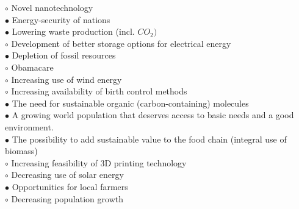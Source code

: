 \documentclass[]{beamer}
\begin{document}
\begin{CJK}{UTF8}{gbsn}
\begin{frame}[shrink] {}
{\color{red}$\circ$} Novel nanotechnology   \\
{\color{red}$\bullet$} Energy-security of nations  \\
{\color{red}$\bullet$} Lowering waste production (incl. $CO_{2})$   \\
{\color{red}$\circ$} Development of better storage options for electrical energy  \\
{\color{red}$\bullet$} Depletion of fossil resources   \\
{\color{red}$\circ$} Obamacare  \\
{\color{red}$\circ$} Increasing use of wind energy  \\
{\color{red}$\circ$} Increasing availability of birth control methods  \\
{\color{red}$\bullet$} The need for sustainable organic (carbon-containing) molecules  \\
{\color{red}$\bullet$} A growing world population that deserves access to basic needs and a good environment.  \\
{\color{red}$\bullet$} The possibility to add sustainable value to the food chain (integral use of biomass)  \\
{\color{red}$\circ$} Increasing feasibility of 3D printing technology  \\
{\color{red}$\circ$} Decreasing use of solar energy  \\
{\color{red}$\bullet$} Opportunities for local farmers  \\
{\color{red}$\circ$} Decreasing population growth  \\
\end{frame}



\end{CJK}
\end{document}
